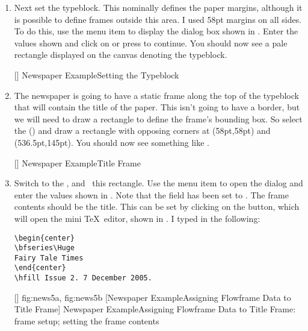 \begin{enumerate}
\item Next set the \gls{typeblock}. This nominally defines the paper
margins, although it is possible to define frames outside this
area. I used 58pt margins on all sides. To do this, use the
 menu item to display
the  dialog box shown in . Enter the values
shown and click on  or press 
to continue. You should now see a pale  rectangle displayed
on the \gls{canvas} denoting the \gls{typeblock}.

[]
{}
{Newspaper Example\dash Setting the Typeblock}

\item The newspaper is going to have a static frame along the
top of the \gls{typeblock} that will contain the title of the paper. This
isn't going to have a border, but we will need to draw a rectangle
to define the frame's bounding box. So select the
 () and draw a
rectangle with opposing corners at (58pt,58pt) and
(536.5pt,145pt). You should now see something like
.

[]
{}
{Newspaper Example\dash Title Frame}

\item Switch to the , and
\select\ this rectangle. Use the  menu item
to open the  dialog and enter the values
shown in . Note that the
 field has been set to
.
The frame contents should be the title.
This can be set by clicking on the 
button, which will open the mini \TeX\ editor, shown in
.
I typed in the following:
\begin{verbatim}
\begin{center}
\bfseries\Huge
Fairy Tale Times
\end{center}
\hfill Issue 2. 7 December 2005.
\end{verbatim}

[]
{
 {fig:news5a}{}{},
 {fig:news5b}{}{}
}
[Newspaper Example\dash Assigning Flowframe Data to Title Frame]
{Newspaper Example\dash Assigning Flowframe Data to Title
Frame:
 frame setup;
 setting the frame contents}


\end{enumerate}
